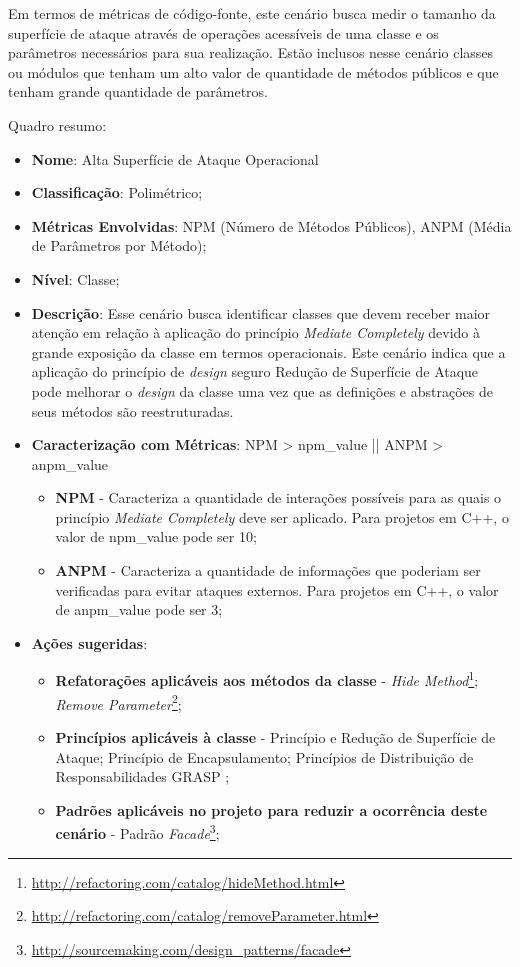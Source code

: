 Em termos de métricas de código-fonte, este cenário busca medir o tamanho da superfície de ataque através de operações acessíveis de uma classe e os parâmetros necessários para sua realização. Estão inclusos nesse cenário classes ou módulos que tenham um alto valor de quantidade de métodos públicos e que tenham grande quantidade de parâmetros. 

%

Quadro resumo:

\begin{itemize}
\item \textbf{Nome}: Alta Superfície de Ataque Operacional
\item \textbf{Classificação}: Polimétrico;
\item \textbf{Métricas Envolvidas}: NPM (Número de Métodos Públicos), ANPM (Média de Parâmetros por Método); 
\item \textbf{Nível}: Classe;
\item \textbf{Descrição}: Esse cenário busca identificar classes que devem receber maior atenção em relação à aplicação do princípio \emph{Mediate Completely} devido à grande exposição da classe em termos operacionais. Este cenário indica que a aplicação do princípio de \emph{design} seguro Redução de Superfície de Ataque pode melhorar o \emph{design} da classe uma vez que as definições e abstrações de seus métodos são reestruturadas.
\item \textbf{Caracterização com Métricas}: NPM > npm\_value || ANPM > anpm\_value
	\begin{itemize}
	\item \textbf{NPM} - Caracteriza a quantidade de interações possíveis para as quais o princípio \emph{Mediate Completely} deve ser aplicado. Para projetos em C++, o valor de npm\_value pode ser 10;
	\item \textbf{ANPM} - Caracteriza a quantidade de informações que poderiam ser verificadas para evitar ataques externos. Para projetos em C++, o valor de anpm\_value pode ser 3; 
	\end{itemize}
\item \textbf{Ações sugeridas}: 
	\begin{itemize}
	\item \textbf{Refatorações aplicáveis aos métodos da classe} - \emph{Hide Method}\footnote{\url{http://refactoring.com/catalog/hideMethod.html}}; \emph{Remove Parameter}\footnote{\url{http://refactoring.com/catalog/removeParameter.html}};
	\item \textbf{Princípios aplicáveis à classe} - Princípio e Redução de Superfície de Ataque; Princípio de Encapsulamento; Princípios de Distribuição de Responsabilidades GRASP \cite{larman2007};
	\item \textbf{Padrões aplicáveis no projeto para reduzir a ocorrência deste cenário} - Padrão \emph{Facade}\footnote{\url{http://sourcemaking.com/design_patterns/facade}};
	\end{itemize}
\end{itemize}


